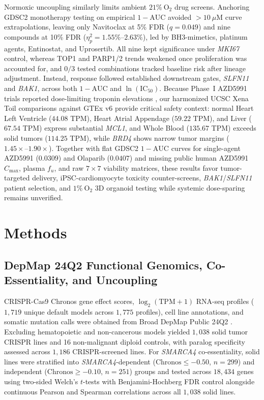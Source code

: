 \documentclass[10pt,twocolumn]{article}
\begin{document}
Normoxic uncoupling similarly limits ambient $21\%\ \text{O}_2$ drug screens. Anchoring GDSC2 monotherapy testing on empirical $1 - \text{AUC}$ avoided $>10\ \mu\text{M}$ curve extrapolations, leaving only Navitoclax at 5\% FDR ($q = 0.049$) and nine compounds at 10\% FDR ($\eta_p^2 = 1.55\%\text{--}2.63\%$), led by BH3-mimetics, platinum agents, Entinostat, and Uprosertib. All nine kept significance under \textit{MKI67} control, whereas TOP1 and PARP1/2 trends weakened once proliferation was accounted for, and $0/3$ tested combinations tracked baseline risk after lineage adjustment. Instead, response followed established downstream gates, \textit{SLFN11} and \textit{BAK1}, across both $1 - \text{AUC}$ and $\ln(\text{IC}_{50})$. Because Phase~I AZD5991 trials reported dose-limiting troponin elevations \cite{desai2024}, our harmonized UCSC Xena Toil comparisons against GTEx v6 provide critical safety context: normal Heart Left Ventricle ($44.08$ TPM), Heart Atrial Appendage ($59.22$ TPM), and Liver ($67.54$ TPM) express substantial \textit{MCL1}, and Whole Blood ($135.67$ TPM) exceeds solid tumors ($114.25$ TPM), while \textit{BRD4} shows narrow tumor margins ($1.45\times\text{--}1.90\times$). Together with flat GDSC2 $1 - \text{AUC}$ curves for single-agent AZD5991 ($0.0309$) and Olaparib ($0.0407$) and missing public human AZD5991 $C_{\max}$, plasma $f_u$, and raw $7 \times 7$ viability matrices, these results favor tumor-targeted delivery, iPSC-cardiomyocyte toxicity counter-screens, \textit{BAK1}/\textit{SLFN11} patient selection, and $1\%\ \text{O}_2$ 3D organoid testing while systemic dose-sparing remains unverified.

\section{Methods}

\subsection{DepMap 24Q2 Functional Genomics, Co-Essentiality, and Uncoupling}
CRISPR-Cas9 Chronos gene effect scores, $\log_2(\text{TPM}+1)$ RNA-seq profiles ($1,719$ unique default models across $1,775$ profiles), cell line annotations, and somatic mutation calls were obtained from Broad DepMap Public 24Q2 \cite{depmap2021}. Excluding hematopoietic and non-cancerous models yielded $1,038$ solid tumor CRISPR lines and 16 non-malignant diploid controls, with paralog specificity assessed across $1,186$ CRISPR-screened lines. For \textit{SMARCA4} co-essentiality, solid lines were stratified into \textit{SMARCA4}-dependent ($\text{Chronos} \le -0.50$, $n = 299$) and independent ($\text{Chronos} \ge -0.10$, $n = 251$) groups and tested across $18,434$ genes using two-sided Welch's $t$-tests with Benjamini-Hochberg FDR control alongside continuous Pearson and Spearman correlations across all $1,038$ solid lines.
\end{document}
